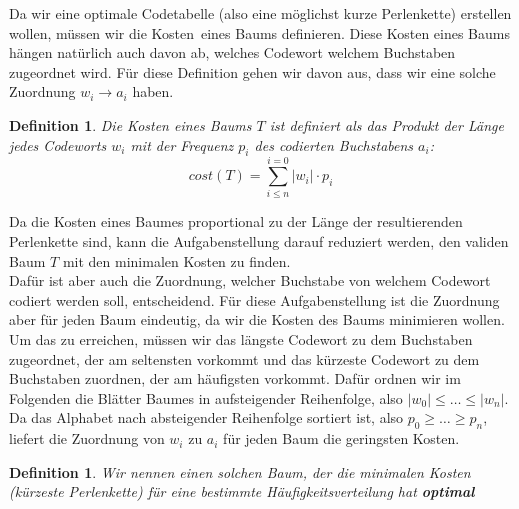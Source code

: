 \documentclass[a4paper,10pt,ngerman]{scrartcl}
\newtheorem{definition}[satz]{Definition}
\begin{document}
    Da wir eine optimale Codetabelle (also eine möglichst kurze Perlenkette) erstellen wollen, müssen wir die \glqq Kosten\grqq~eines Baums definieren.
    Diese Kosten eines Baums hängen natürlich auch davon ab, welches Codewort welchem Buchstaben zugeordnet wird. Für diese Definition gehen wir
    davon aus, dass wir eine solche Zuordnung $w_i \to a_i$ haben.
    \begin{definition}
        Die Kosten eines Baums $T$ ist definiert als das Produkt der Länge jedes Codeworts $w_i$ mit der Frequenz $p_i$ des codierten Buchstabens $a_i$: \[cost(T) = \sum^{i=0}_{i\le n} |w_i| \cdot p_i\]
    \end{definition}
    Da die Kosten eines Baumes proportional zu der Länge der resultierenden Perlenkette sind, kann die Aufgabenstellung darauf reduziert werden, den validen Baum $T$ mit den minimalen Kosten zu finden. \\
    Dafür ist aber auch die Zuordnung, welcher Buchstabe von welchem Codewort codiert werden soll, entscheidend.
    Für diese Aufgabenstellung ist die Zuordnung aber für jeden Baum eindeutig, da wir die Kosten des Baums minimieren wollen.
    Um das zu erreichen, müssen wir das längste Codewort zu dem Buchstaben zugeordnet, der am seltensten vorkommt und das kürzeste Codewort zu dem Buchstaben zuordnen, der am häufigsten vorkommt.
    Dafür ordnen wir im Folgenden die Blätter Baumes in aufsteigender Reihenfolge, also $|w_0| \le \dots \le |w_n|$.
    Da das Alphabet nach absteigender Reihenfolge sortiert ist, also $p_0 \ge \dots \ge p_n$, liefert die Zuordnung von $w_i$ zu $a_i$ für jeden Baum die geringsten Kosten. \\
    \begin{definition}
        Wir nennen einen solchen Baum, der die minimalen Kosten (kürzeste Perlenkette) für eine bestimmte Häufigkeitsverteilung hat \textbf{optimal}
    \end{definition}
\end{document}
